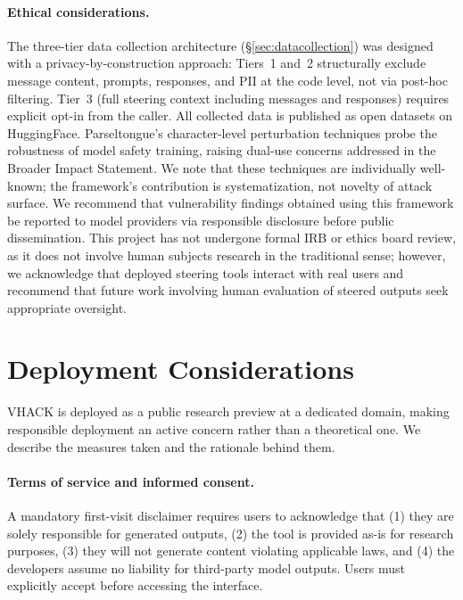 \documentclass[11pt]{article}
\begin{document}
\paragraph{Ethical considerations.}
The three-tier data collection architecture (\S\ref{sec:datacollection}) was designed with a privacy-by-construction approach: Tiers~1 and~2 structurally exclude message content, prompts, responses, and PII at the code level, not via post-hoc filtering. Tier~3 (full steering context including messages and responses) requires explicit opt-in from the caller. All collected data is published as open datasets on HuggingFace.
Parseltongue's character-level perturbation techniques probe the robustness of model safety training, raising dual-use concerns addressed in the Broader Impact Statement. We note that these techniques are individually well-known; the framework's contribution is systematization, not novelty of attack surface.
We recommend that vulnerability findings obtained using this framework be reported to model providers via responsible disclosure before public dissemination. This project has not undergone formal IRB or ethics board review, as it does not involve human subjects research in the traditional sense; however, we acknowledge that deployed steering tools interact with real users and recommend that future work involving human evaluation of steered outputs seek appropriate oversight.

\section{Deployment Considerations}
\label{sec:deployment}

VHACK is deployed as a public research preview at a dedicated domain, making responsible deployment an active concern rather than a theoretical one. We describe the measures taken and the rationale behind them.

\paragraph{Terms of service and informed consent.} A mandatory first-visit disclaimer requires users to acknowledge that (1) they are solely responsible for generated outputs, (2) the tool is provided as-is for research purposes, (3) they will not generate content violating applicable laws, and (4) the developers assume no liability for third-party model outputs. Users must explicitly accept before accessing the interface.
\end{document}
